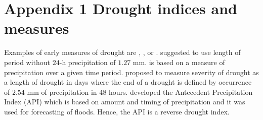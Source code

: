 \documentclass[a4paper,12pt]{article}
\begin{document}
\pagebreak











\makeatletter 
\renewcommand{\thesection}{\hspace*{-1.0em}}
\newpage
\linespread{1}

%


\newpage


\setcounter{table}{0} 
\makeatletter 
\renewcommand{\thetable}{A\@arabic \c@table} 
\FloatBarrier


\section{Appendix 1 Drought indices and measures}

Examples of early measures of drought are \cite{wilhite1985}, \cite{munger1916}, \cite{blumenstock1942} or \cite{mcquigg1954}. \cite{munger1916} suggested to use length of period without $24$-h precipitation of $1.27$ mm. \cite{wilhite1985} is based on a measure of precipitation over a given time period. \cite{blumenstock1942} proposed to measure severity of drought as a length of drought in days where the end of a drought is defined by occurrence of $2.54$ mm of precipitation in $48$ hours. \cite{mcquigg1954} developed the Antecedent Precipitation Index (API) which is based on amount and timing of precipitation and it was used for forecasting of floods. Hence, the API is a reverse drought index.
\end{document}
